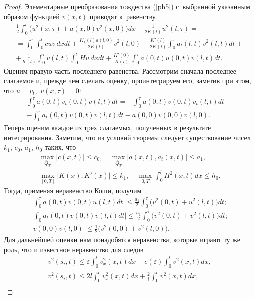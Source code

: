 \begin{proof}
Элементарные преобразования тождества (\ref{ph5}) с~выбранной указанным образом функцией $v(x,t)$ приводят к~равенству
\begin{multline}
\frac{1}{2} \int _0^l 
\bigl( u^2(x,\tau)+a(x, 0)v^2(x, 0)\bigr)dx+\frac{1}{2K(l)}u^2(l,\tau)=
\\
= \int _0^{\tau} \int _0^lcuv\, dxdt+\frac{K_x(l)a(l, 0)}{2K(l)}v^2(l, 0)+
\frac{K'(l)}{2K(l)} \int _0^{\tau}a_t(l, t)v^2(l, t)dt+
\\
 \label{ph6}
+\frac{1}{K(l)} \int _0^{\tau}v(l, t) \int _0^l Hu \,dxdt+
\frac{K'(0)}{K(l)} \int _0^{\tau}a(0, t)u(0, t)v(l, t)dt.
\end{multline}
Оценим правую часть последнего равенства.  
Рассмотрим сначала последнее слагаемое и, прежде чем сделать оценку, проинтегрируем его, заметив при этом,
что $u=v_t,$ $ v(x,\tau)=0$:
\begin{multline}
 \int _0^{\tau}a(0, t )v_t(0, t)v(l,t)dt=
- \int _0^{\tau}a(0, t)v(0, t)v_t(l,t)dt-
\\
- \int _0^{\tau}a_t(0, t)v(0, t)v(l, t)dt
-a(0,0)v(0, 0)v(l, 0).
\end{multline}
Теперь оценим каждое из трех слагаемых, полученных в результате интегрирования.
Заметим, что из условий теоремы следует существование чисел $k_1$, $c_0$, $a_1$, $h_0$ таких, что
\begin{gather}
\max\limits_{\bar{Q}_T}|c(x,t)|\leq c_0, \quad 
 \max\limits_{\bar{Q}_T}|a(x,t),  a_t(x,t)|\leq a_1,\\
\max\limits_{[0, T]}|K(x),  K'(x)|\leq k_1, \quad 
 \max\limits_{[0, T]} \int _0^lH^2(x,t)dx\leq h_0.
 \end{gather}
Тогда, применяя неравенство Коши, получим
\begin{gather}
\biggl| \int _0^{\tau}a(0, t)v(0, t)u(l,t)dt \biggr|\leq \frac{a_1}{2} \int _0^{\tau}\bigl( v^2(0,t)+u^2(l,t)\bigr)dt;
\\
\biggl| \int _0^{\tau}a_t(0, t)v(0, t)v(l,t)dt \biggr|\leq \frac{a_1}{2} \int _0^{\tau}\bigl(v^2(0,t)+v^2(l,t)\bigr)dt;
\\
\bigl|v(0, 0)v(l, 0)\bigr|\leq \frac{1}{2}\bigl(v^2(0, 0)+v^2(l, 0)\bigr).
\end{gather}
Для дальнейшей оценки нам понадобятся неравенства, которые играют ту же роль, что и
известное неравенство для следов \cite[с.~77]{pulkinals:bib:lad}
\begin{gather}
v^2(s_i,t)\leq \varepsilon  \int _0^lv_x^2(x,t)dx + c(\varepsilon) \int _0^lv^2(x,t)dx,\\
v^2(s_i,t)\leq 2l \int _0^lv_x^2(x,t)dx+\frac{2}{l} \int _0^lv^2(x,t)dx,\\

\end{gather}
\end{proof}
